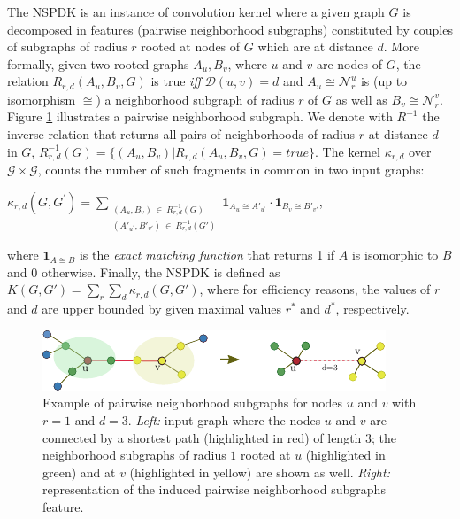 \documentclass[review]{elsarticle}
\begin{document}
The NSPDK \cite{costa2010fast} is an instance of convolution kernel \cite{haussler1999convolution} where a given
 graph $G$ is decomposed in features (pairwise neighborhood subgraphs) constituted by couples of subgraphs of radius $r$ rooted at nodes of $G$ which are
 at distance $d$. More formally, given two rooted graphs $A_u, B_v$, where $u$ and $v$ are nodes of $G$, the relation $R_{r,d}(A_u, B_v, G)$ is true {\em iff}  $\mathcal{D}(u,v)= d$ and $A_u \cong \mathcal{N}_r^u$ is (up to isomorphism $\cong$) a neighborhood subgraph of radius $r$ of $G$ as well as $B_v \cong  \mathcal{N}_r^v$. Figure \ref{fig:nspdk} illustrates a pairwise neighborhood subgraph. We denote with $R^{-1}$ the inverse relation that returns all pairs of neighborhoods of radius $r$ at distance $d$ in $G$, $R^{-1}_{r,d}(G) = \lbrace (A_u, B_v) | R_{r,d}(A_u,B_v,G)=true\rbrace$. The kernel $\kappa_{r,d}$ over $\mathcal{G} \times \mathcal{G}$, counts the number of such fragments in common in two input graphs: 
\begin{center}
$\kappa_{r,d}(G,G^{'}) = 
\!\!\!\!\!\!\!\!\!\!\!\! 
\sum\limits_{\substack{(A_u, B_v) \ \in \ R_{r,d}^{-1}(G) \\ 
({A'}_{u^\prime}, {B'}_{v'}) \ \in \ R_{r,d}^{-1}(G')
}} \!\!\!\!\!\!\!\!\!\!\!\!  { { \textbf{1}_{A_{u} \cong A'_{u^\prime}}} \cdot {
\textbf{1}_{B_{v} \cong B'_{v'}}} }$, 
\end{center} 
\noindent where $\textbf{1}_{A \cong B}$ is the \textit{exact matching function} that returns 1 if $A$ is
isomorphic to $B$ and 0 otherwise.  Finally, the NSPDK is defined as $K(G,G') = \sum\limits_{r}{\sum\limits_{d}{\kappa_{r,d}(G,G')}}$, where for efficiency reasons, the values of $r$ and $d$ are upper bounded by  given maximal values $r^*$ and $d^*$, respectively.
\begin{figure}
\centering
\includegraphics[width=.9\textwidth]{nspdk}
\caption{\label{fig:nspdk} Example of pairwise neighborhood subgraphs for nodes $u$ and $v$ with $r=1$ and \mbox{$d=3$}. {\it Left:} input graph where the nodes $u$ and $v$ are connected by a shortest path (highlighted in red) of length 3; the neighborhood subgraphs of radius $1$ rooted at $u$ (highlighted in green) and at $v$ (highlighted in yellow) are shown as well. {\it Right:} representation of the induced pairwise neighborhood subgraphs feature.}
\end{figure}
\end{document}
